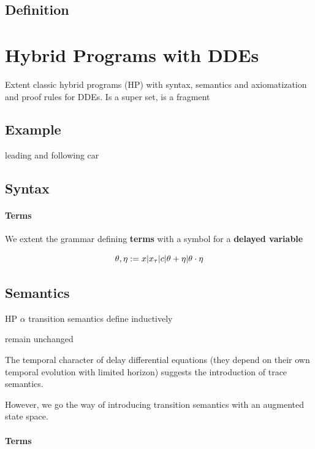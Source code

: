 \documentclass[10pt]{article}
\begin{document}
\subsection{Definition}\label{definition}

\section{Hybrid Programs with DDEs}\label{hybrid-programs-with-ddes}

Extent classic hybrid programs (HP) with syntax, semantics and axiomatization and proof rules for DDEs. Is a super set, \dL is a fragment

\subsection{Example}\label{example-1}

leading and following car

\subsection{Syntax}\label{syntax}

\paragraph{Terms}\label{terms}

We extent the grammar defining \textbf{terms} with a symbol for a \textbf{delayed variable}

\begin{equation} \theta,\eta := x|x_{\tau}|c|\theta+\eta|\theta\cdot\eta \end{equation}

\subsection{Semantics}\label{semantics}

HP $\alpha$ transition semantics define inductively

remain unchanged

The temporal character of delay differential equations (they depend on their own temporal evolution with limited horizon) suggests the introduction of trace semantics.

However, we go the way of introducing transition semantics with an augmented state space.

\paragraph{Terms}\label{terms-1}
\end{document}
